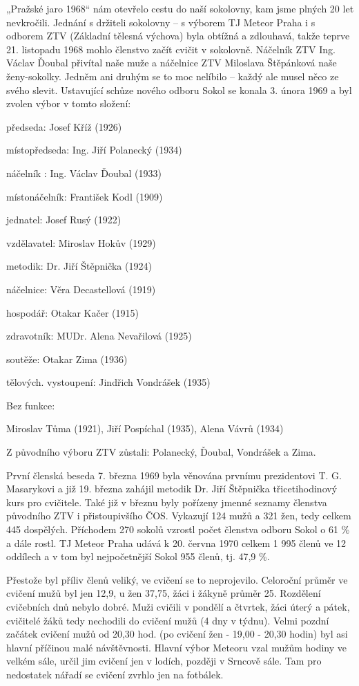 „Pražské jaro 1968`` nám otevřelo cestu do naší sokolovny, kam jsme
plných 20 let nevkročili. Jednání s držiteli sokolovny -- s výborem TJ
Meteor Praha i s odborem ZTV (Základní tělesná výchova) byla obtížná a
zdlouhavá, takže teprve 21. listopadu 1968 mohlo členstvo začít cvičit v
sokolovně. Náčelník ZTV Ing. Václav Ďoubal přivítal naše muže a
náčelnice ZTV Miloslava Štěpánková naše ženy-sokolky. Jedněm ani druhým
se to moc nelíbilo -- každý ale musel něco ze svého slevit. Ustavující
schůze nového odboru Sokol se konala 3. února 1969 a byl zvolen výbor v
tomto složení:

předseda: Josef Kříž (1926)

místopředseda: Ing. Jiří Polanecký (1934)

náčelník : Ing. Václav Ďoubal (1933)

místonáčelník: František Kodl (1909)

jednatel: Josef Rusý (1922)

vzdělavatel: Miroslav Hokův (1929)

metodik: Dr. Jiří Štěpnička (1924)

náčelnice: Věra Decastellová (1919)

hospodář: Otakar Kačer (1915)

zdravotník: MUDr. Alena Nevařilová (1925)

soutěže: Otakar Zima (1936)

tělových. vystoupení: Jindřich Vondrášek (1935)

Bez funkce:

Miroslav Tůma (1921), Jiří Pospíchal (1935), Alena Vávrů (1934)

Z původního výboru ZTV zůstali: Polanecký, Ďoubal, Vondrášek a Zima.

První členská beseda 7. března 1969 byla věnována prvnímu prezidentovi
T. G. Masarykovi a již 19. března zahájil metodik Dr. Jiří Štěpnička
třicetihodinový kurs pro cvičitele. Také již v březnu byly pořízeny
jmenné seznamy členstva původního ZTV i přistoupivšího ČOS. Vykazují 124
mužů a 321 žen, tedy celkem 445 dospělých. Příchodem 270 sokolů vzrostl
počet členstva odboru Sokol o 61 \% a dále rostl. TJ Meteor Praha udává
k 20. června 1970 celkem 1 995 členů ve 12 oddílech a v tom byl
nejpočetnější Sokol 955 členů, tj. 47,9 \%.

Přestože byl příliv členů veliký, ve cvičení se to neprojevilo.
Celoroční průměr ve cvičení mužů byl jen 12,9, u žen 37,75, žáci i
žákyně průměr 25. Rozdělení cvičebních dnů nebylo dobré. Muži cvičili v
pondělí a čtvrtek, žáci úterý a pátek, cvičitelé žáků tedy nechodili do
cvičení mužů (4 dny v týdnu). Velmi pozdní začátek cvičení mužů od 20,30
hod. (po cvičení žen - 19,00 - 20,30 hodin) byl asi hlavní příčinou malé
návštěvnosti. Hlavní výbor Meteoru vzal mužům hodiny ve velkém sále,
určil jim cvičení jen v lodích, později v Srncově sále. Tam pro
nedostatek nářadí se cvičení zvrhlo jen na fotbálek.

